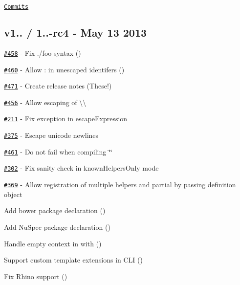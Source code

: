 \href{https://github.com/wycats/handlebars.js/compare/v1.0.11...v1.0.12}{\tt Commits}

\subsection*{v1.. / 1..-\/rc4 -\/ May 13 2013}


\begin{DoxyItemize}
\item \href{https://github.com/wycats/handlebars.js/issues/458}{\tt \#458} -\/ Fix {\ttfamily ./foo} syntax (\href{https://github.com/jpfiset}{\tt })
\item \href{https://github.com/wycats/handlebars.js/issues/460}{\tt \#460} -\/ Allow {\ttfamily \+:} in unescaped identifers (\href{https://github.com/jpfiset}{\tt })
\item \href{https://github.com/wycats/handlebars.js/issues/471}{\tt \#471} -\/ Create release notes (These!)
\item \href{https://github.com/wycats/handlebars.js/issues/456}{\tt \#456} -\/ Allow escaping of {\ttfamily \textbackslash{}\textbackslash{}}
\item \href{https://github.com/wycats/handlebars.js/issues/211}{\tt \#211} -\/ Fix exception in {\ttfamily escape\+Expression}
\item \href{https://github.com/wycats/handlebars.js/issues/375}{\tt \#375} -\/ Escape unicode newlines
\item \href{https://github.com/wycats/handlebars.js/issues/461}{\tt \#461} -\/ Do not fail when compiling {\ttfamily \char`\"{}\char`\"{}}
\item \href{https://github.com/wycats/handlebars.js/issues/302}{\tt \#302} -\/ Fix sanity check in known\+Helpers\+Only mode
\item \href{https://github.com/wycats/handlebars.js/issues/369}{\tt \#369} -\/ Allow registration of multiple helpers and partial by passing definition object
\item Add bower package declaration (\href{https://github.com/DevinClark}{\tt })
\item Add Nu\+Spec package declaration (\href{https://github.com/MikeMayer}{\tt })
\item Handle empty context in {\ttfamily with} (\href{https://github.com/thejohnfreeman}{\tt })
\item Support custom template extensions in C\+L\+I (\href{https://github.com/matteoagosti}{\tt })
\item Fix Rhino support (\href{https://github.com/broady}{\tt })

\end{DoxyItemize}
